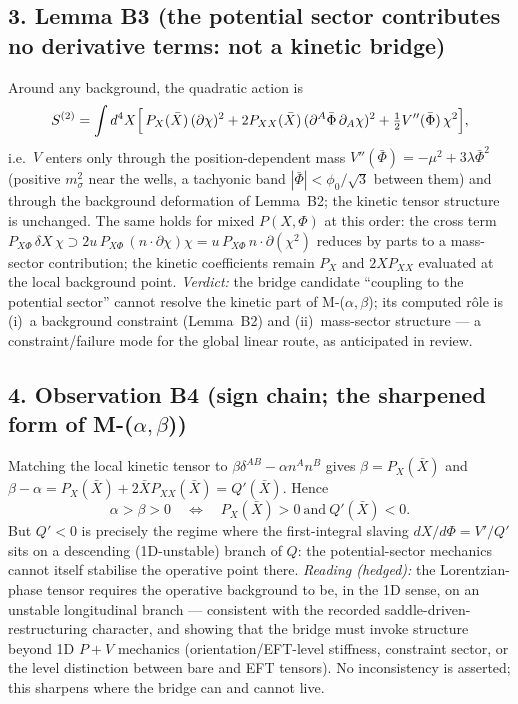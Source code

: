 \subsection*{3. Lemma B3 (the potential sector contributes no
derivative terms: not a kinetic bridge)}
Around any background, the quadratic action is
\[
S^{(2)}=\int d^4X\Bigl[\,P_X(\bar X)\,(\partial\chi)^2
+2P_{XX}(\bar X)\,(\partial^A\bar\Phi\,\partial_A\chi)^2
+\tfrac12 V''(\bar\Phi)\,\chi^2\Bigr],
\]
i.e.\ $V$ enters only through the position-dependent mass
$V''(\bar\Phi)=-\mu^2+3\lambda\bar\Phi^2$ (positive
$m_\sigma^2$ near the wells, a tachyonic band
$|\bar\Phi|<\phi_0/\sqrt3$ between them) and through the
background deformation of Lemma~B2; the kinetic tensor structure
is unchanged.
The same holds for mixed $P(X,\Phi)$ at this order: the cross
term $P_{X\Phi}\,\delta X\,\chi\supset 2u\,P_{X\Phi}\,
(n\!\cdot\!\partial\chi)\chi=u\,P_{X\Phi}\,n\!\cdot\!\partial
(\chi^2)$ reduces by parts to a mass-sector contribution; the
kinetic coefficients remain $P_X$ and $2XP_{XX}$ evaluated at the
local background point.
\emph{Verdict:} the bridge candidate ``coupling to the potential
sector'' cannot resolve the kinetic part of M-($\alpha,\beta$);
its computed r\^ole is (i)~a background constraint (Lemma~B2) and
(ii)~mass-sector structure --- a constraint/failure mode for the
global linear route, as anticipated in review.

\subsection*{4. Observation B4 (sign chain; the sharpened form of
M-($\alpha,\beta$))}
Matching the local kinetic tensor to
$\beta\delta^{AB}-\alpha n^An^B$ gives
$\beta=P_X(\bar X)$ and
$\beta-\alpha=P_X(\bar X)+2\bar X P_{XX}(\bar X)=Q'(\bar X)$.
Hence
\[
\alpha>\beta>0
\quad\Longleftrightarrow\quad
P_X(\bar X)>0\ \text{and}\ Q'(\bar X)<0 .
\]
But $Q'<0$ is precisely the regime where the first-integral
slaving $dX/d\Phi=V'/Q'$ sits on a descending (1D-unstable)
branch of $Q$: the potential-sector mechanics cannot itself
stabilise the operative point there.
\emph{Reading (hedged):} the Lorentzian-phase tensor requires the
operative background to be, in the 1D sense, on an unstable
longitudinal branch --- consistent with the recorded
saddle-driven-restructuring character, and showing that the
bridge must invoke structure beyond 1D $P{+}V$ mechanics
(orientation/EFT-level stiffness, constraint sector, or the level
distinction between bare and EFT tensors).
No inconsistency is asserted; this sharpens where the bridge can
and cannot live.

